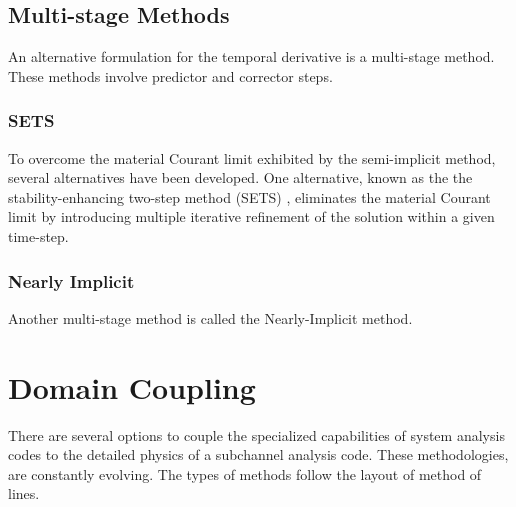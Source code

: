 \subsection{Multi-stage Methods}
\label{subsect:numerics_multistep}
An alternative formulation for the temporal derivative is a multi-stage method.
These methods involve predictor and corrector steps.


\subsubsection{SETS}
\label{subsubsect:numerics_sets}
To overcome the material Courant limit exhibited by the semi-implicit method, several alternatives have been developed.
One alternative, known as the the stability-enhancing two-step method (SETS) \cite{Mahaffy1982}, eliminates the material Courant limit by introducing multiple iterative refinement of the solution within a given time-step.

\subsubsection{Nearly Implicit}
\label{subsubsect:numerics_nearly_implicit}
Another multi-stage method is called the Nearly-Implicit method.
\section{Domain Coupling}
\label{sect:code_coupling}
There are several options to couple the specialized capabilities of system analysis codes to the detailed physics of a subchannel analysis code.
These methodologies, are constantly evolving.
The types of methods follow the layout of method of lines.

